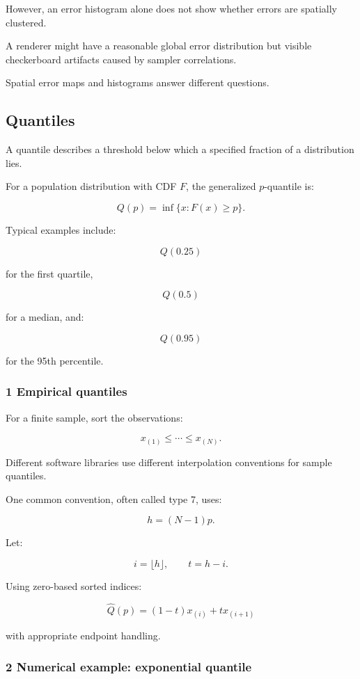 However, an error histogram alone does not show whether errors are spatially clustered.

A renderer might have a reasonable global error distribution but visible checkerboard artifacts caused by sampler correlations.

Spatial error maps and histograms answer different questions.

\subsection{Quantiles}\label{02-foundations-ii-ch030-quantiles}

A quantile describes a threshold below which a specified fraction of a distribution lies.

For a population distribution with CDF \(F\), the generalized \(p\)-quantile is:

\[
 \boxed{ Q(p)=\inf\{x:F(x)\ge p\} }.
\]

Typical examples include:

\[
 Q(0.25)
\]

for the first quartile,

\[
 Q(0.5)
\]

for a median, and:

\[
 Q(0.95)
\]

for the 95th percentile.

\subsubsection{1 Empirical quantiles}\label{02-foundations-ii-ch030-empirical-quantiles}

For a finite sample, sort the observations:

\[
 x_{(1)}\le\cdots\le x_{(N)}.
\]

Different software libraries use different interpolation conventions for sample quantiles.

One common convention, often called type 7, uses:

\[
 h=(N-1)p.
\]

Let:

\[
 i=\lfloor h\rfloor, \qquad t=h-i.
\]

Using zero-based sorted indices:

\[
 \boxed{ \hat Q(p)=(1-t)x_{(i)}+t x_{(i+1)} }
\]

with appropriate endpoint handling.

\subsubsection{2 Numerical example: exponential quantile}\label{02-foundations-ii-ch030-numerical-example-exponential-quantile}

